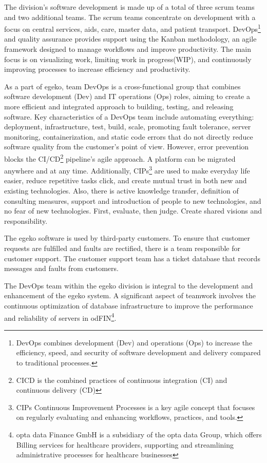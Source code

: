 The division's software development is made up of a total of three scrum teams and two additional teams. The scrum teams concentrate on development with a focus on central services, aids, care, master data, and patient transport. DevOps\footnote{DevOps combines development (Dev) and operations (Ops) to increase the efficiency, speed, and security of software development and delivery compared to traditional processes.} and quality assurance provides support using the Kanban methodology, an agile framework designed to manage workflows and improve productivity. The main focus is on visualizing work, limiting work in progress(WIP), and continuously improving processes to increase efficiency and productivity. \vspace{.4cm} 

As a part of egeko, team DevOps is a cross-functional group that combines software development (Dev) and IT operations (Ops) roles, aiming to create a more efficient and integrated approach to building, testing, and releasing software. Key characteristics of a DevOps team include automating everything: deployment, infrastructure, test, build, scale, promoting fault tolerance, server monitoring, containerization, and static code errors that do not directly reduce software quality from the customer's point of view. However, error prevention blocks the CI/CD\footnote{CICD is the combined practices of continuous integration (CI) and continuous delivery (CD)} pipeline's agile approach. A platform can be migrated anywhere and at any time. Additionally, CIPs\footnote{CIPs Continuous Improvement Processes is a key agile concept that focuses on regularly evaluating and enhancing workflows, practices, and tools.} are used to make everyday life easier, reduce repetitive tasks click, and create mutual trust in both new and existing technologies. Also, there is active knowledge transfer, definition of consulting measures, support and introduction of people to new technologies, and no fear of new technologies. First, evaluate, then judge. Create shared visions and responsibility. \vspace{.4cm}

The egeko software is used by third-party customers. To ensure that customer requests are fulfilled and faults are rectified, there is a team responsible for customer support. The customer support team has a ticket database that records messages and faults from customers.\vspace{.4cm}

The DevOps team within the egeko division is integral to the development and enhancement of the egeko system. A significant aspect of teamwork involves the continuous optimization of database infrastructure to improve the performance and reliability of servers in odFIN\footnote{opta data Finance GmbH is a subsidiary of the opta data Group, which offers Billing services for healthcare providers, supporting and streamlining administrative processes for healthcare businesses}.

